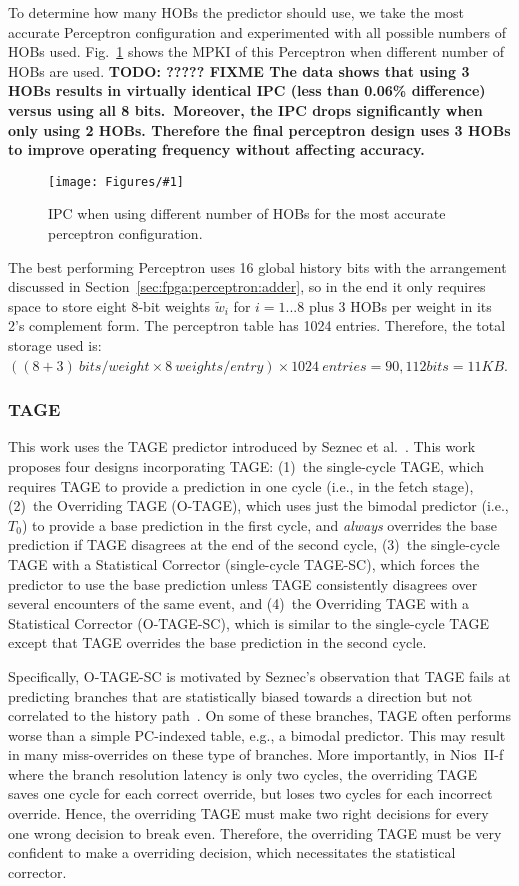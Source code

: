 \documentclass[conference]{IEEEtran}
\newcommand{\kfig}[4]{ %
        \begin{figure}[!t]
        \centering
        \texttt{[image: Figures/\#1]}
        \vspace{-1mm}
        \caption{#3}
        \label{#2}
        \end{figure}
}
\begin{document}
To determine how many HOBs the predictor should use, we take the most accurate Perceptron configuration and experimented with all possible numbers of HOBs used. Fig.~\ref{fig:perceptronHOB} shows the MPKI of this Perceptron when different number of HOBs are used. 
\textbf{TODO: ????? FIXME The data shows that using 3 HOBs results in virtually identical IPC (less than 0.06\% difference) versus using all 8 bits.\ Moreover, the IPC drops significantly when only using 2 HOBs. Therefore the final perceptron design uses 3 HOBs to improve operating frequency without affecting accuracy.}
\kfig{perceptronHOB.pdf}{fig:perceptronHOB}{IPC when using different number of HOBs for the most accurate perceptron configuration.}{angle = 0, trim = 1in 2.5in 0.9in 2.5in, clip, width=0.4\textwidth}

The best performing Perceptron uses 16 global history bits with the arrangement discussed in Section~\ref{sec:fpga:perceptron:adder}, so in the end it only requires space to store eight 8-bit weights $\widetilde{w}_{i}$ for $i = 1...8$ plus 3 HOBs per weight in its 2's complement form. The perceptron table has 1024 entries. Therefore, the total storage used is: $ ((8+ 3)\ bits/weight \times 8\ weights/entry)\times 1024\ entries  = 90,112 bits = 11KB$. 

\subsubsection{TAGE}
\label{sec:eval:ipc:tage}
This work uses the TAGE predictor introduced by Seznec et al.~\cite{tage}.  This work proposes four designs incorporating TAGE:  (1)~the single-cycle TAGE, which requires TAGE to provide a prediction in one cycle (i.e., in the fetch stage), (2)~the Overriding TAGE (\mbox{O-TAGE}), which uses just the bimodal predictor (i.e., $T_0$) to provide a base prediction in the first cycle, and \textit{always} overrides the base prediction if TAGE disagrees at the end of the second cycle, (3)~the single-cycle TAGE with a Statistical Corrector (single-cycle \mbox{TAGE-SC}), which forces the predictor to use the base prediction unless TAGE consistently disagrees over several encounters of the same event, and (4)~the Overriding TAGE with a Statistical Corrector (\mbox{O-TAGE-SC}), which is similar to the single-cycle TAGE except that TAGE overrides the base prediction in the second cycle.

Specifically,  \mbox{O-TAGE-SC} is motivated by Seznec's observation that TAGE fails at predicting branches that are statistically biased towards a direction but not correlated to the history path~\cite{isltage}. On some of these branches, TAGE often performs worse than a simple PC-indexed table, e.g., a bimodal predictor. This may result in many miss-overrides on these type of branches. More importantly, in Nios~II-f where the branch resolution latency is only two cycles, the overriding TAGE saves one cycle for each correct override, but loses two cycles for each incorrect override. Hence, the overriding TAGE must make two right decisions for every one wrong decision to break even. Therefore, the overriding TAGE must be very confident to make a overriding decision, which necessitates the statistical corrector.
\end{document}
